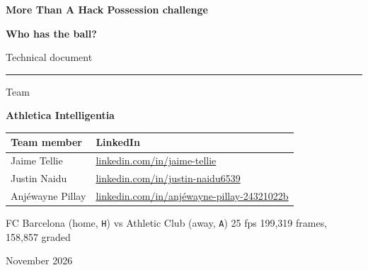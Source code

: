\documentclass[10pt,a4paper]{article}
\newcommand{\lbl}[1]{\texttt{#1}}
\renewcommand{\arraystretch}{1.25}
\begin{document}
\begin{titlepage}

\vspace*{3.2cm}
{\large\color{ours}\bfseries More Than A Hack \textperiodcentered{} Possession challenge}\par
\vspace{0.6cm}
{\fontsize{34}{40}\selectfont\bfseries Who has the ball?}\par
\vspace{0.4cm}
{\Large\color{ink2} Technical document}\par
\vspace{0.5cm}
{\color{ours}\rule{3cm}{2pt}}\par
\vspace{0.9cm}
{\normalsize\color{ink2}Team}\par
\vspace{0.1cm}
{\huge\bfseries Athletica Intelligentia}\par
\vspace{1.6cm}

{\renewcommand{\arraystretch}{1.6}
\begin{tabular}{@{}p{5.2cm}l@{}}
\toprule
\textbf{Team member} & \textbf{LinkedIn} \\
\midrule
Jaime Tellie & \href{https://www.linkedin.com/in/jaime-tellie/}{\textcolor{ours}{linkedin.com/in/jaime-tellie}} \\
Justin Naidu & \href{https://www.linkedin.com/in/justin-naidu6539/}{\textcolor{ours}{linkedin.com/in/justin-naidu6539}} \\
Anjéwayne Pillay & \href{https://www.linkedin.com/in/anj\%C3\%A9wayne-pillay-24321022b/}{\textcolor{ours}{linkedin.com/in/anjéwayne-pillay-24321022b}} \\
\bottomrule
\end{tabular}}

\vfill
{\small\color{ink2}
FC Barcelona (home, \lbl{H}) vs Athletic Club (away, \lbl{A}) \textperiodcentered{}
25 fps \textperiodcentered{} 199,319 frames, 158,857 graded\par
\vspace{0.2cm}
November 2026}
\restoregeometry
\end{titlepage}
\setcounter{page}{1}
\end{document}
